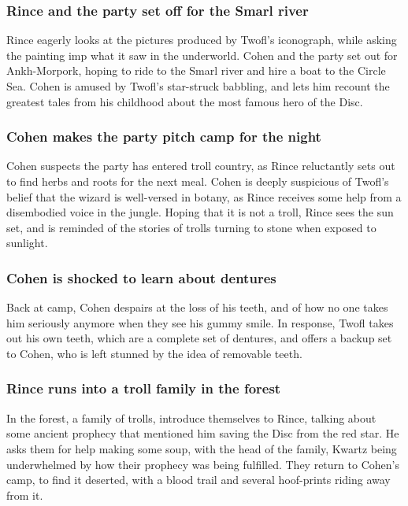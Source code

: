 \subsubsection{\Gls{Rince} and the party set off for the Smarl river}
\Gls{Rince} eagerly looks at the pictures produced by \Gls{Twofl}'s iconograph, while asking the
painting imp what it saw in the underworld. \Gls{Cohen} and the party set out for Ankh-Morpork,
hoping to ride to the Smarl river and hire a boat to the Circle Sea. \Gls{Cohen} is amused by
\Gls{Twofl}'s star-struck babbling, and lets him recount the greatest tales from his childhood about
the most famous hero of the Disc.

\subsubsection{\Gls{Cohen} makes the party pitch camp for the night}
\Gls{Cohen} suspects the party has entered troll country, as \Gls{Rince} reluctantly sets out to
find herbs and roots for the next meal. \Gls{Cohen} is deeply suspicious of \Gls{Twofl}'s belief
that the wizard is well-versed in botany, as \Gls{Rince} receives some help from a disembodied
voice in the jungle. Hoping that it is not a troll, \Gls{Rince} sees the sun set, and is reminded of
the stories of trolls turning to stone when exposed to sunlight.

\subsubsection{\Gls{Cohen} is shocked to learn about dentures}
Back at camp, \Gls{Cohen} despairs at the loss of his teeth, and of how no one takes him seriously
anymore when they see his gummy smile. In response, \Gls{Twofl} takes out his own teeth, which are
a complete set of dentures, and offers a backup set to \Gls{Cohen}, who is left stunned by the
idea of removable teeth.

\subsubsection{\Gls{Rince} runs into a troll family in the forest}
In the forest, a family of trolls, introduce themselves to \Gls{Rince}, talking about some ancient
prophecy that mentioned him saving the Disc from the red star. He asks them for help making some
soup, with the head of the family, \Gls{Kwartz} being underwhelmed by how their prophecy was
being fulfilled. They return to \Gls{Cohen}'s camp, to find it deserted, with a blood trail and
several hoof-prints riding away from it.

